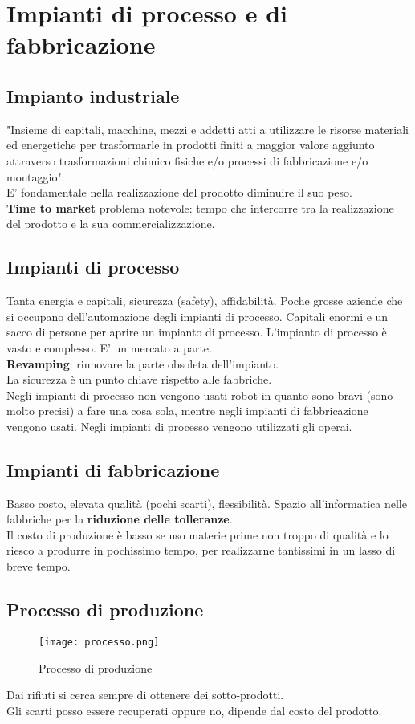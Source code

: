 \documentclass[../main.tex]{subfiles}
\begin{document}
\section{Impianti di processo e di fabbricazione}
\subsection*{Impianto industriale}
"Insieme di capitali, macchine, mezzi e addetti atti a utilizzare le risorse materiali ed
energetiche per trasformarle in prodotti finiti a maggior valore aggiunto attraverso
trasformazioni chimico fisiche e/o processi di fabbricazione e/o montaggio".\\
E' fondamentale nella realizzazione del prodotto diminuire il suo peso.\\
\textbf{Time to market} problema notevole: tempo che intercorre tra la realizzazione del prodotto e la sua commercializzazione.
\subsection{Impianti di processo}
Tanta energia e capitali, sicurezza (safety), affidabilità. Poche grosse aziende che si occupano dell'automazione degli impianti di processo. Capitali enormi e un sacco di persone per aprire un impianto di processo. L'impianto di processo è vasto e complesso. E' un mercato a parte.\\
\textbf{Revamping}: rinnovare la parte obsoleta dell'impianto.\\
La sicurezza è un punto chiave rispetto alle fabbriche.\\ Negli impianti di processo non vengono usati robot in quanto sono bravi (sono molto precisi) a fare una cosa sola, mentre negli impianti di fabbricazione vengono usati. Negli impianti di processo vengono utilizzati gli operai.\\
\subsection{Impianti di fabbricazione}
Basso costo, elevata qualità (pochi scarti), flessibilità.
Spazio all'informatica nelle fabbriche per la \textbf{riduzione delle tolleranze}.\\
Il costo di produzione è basso se uso materie prime non troppo di qualità e lo riesco a produrre in pochissimo tempo, per realizzarne tantissimi in un lasso di breve tempo.

\newpage
\subsection{Processo di produzione}
\begin{figure}[h!]
    \centering
    \texttt{[image: processo.png]}
    \caption{Processo di produzione}
\end{figure}
Dai rifiuti si cerca sempre di ottenere dei sotto-prodotti.\\
Gli scarti posso essere recuperati oppure no, dipende dal costo del prodotto.\\
\end{document}
